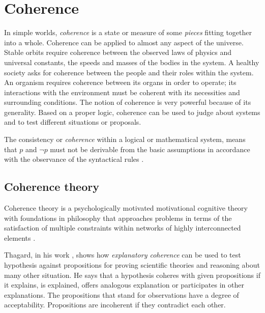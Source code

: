 \section{Coherence}
\label{sec:Coherence}

\def\coh{\mathrm{coh}}
\def\cohi{\mathrm{\widetilde{coh}}}

\medskip

In simple worlds, \emph{coherence} is a state or measure of some \emph{pieces}
fitting together into a whole. Coherence can be applied to almost any aspect of
the universe. Stable orbits require coherence between the observed laws of physics
and universal constants, the speeds and masses of the bodies in the system.
A healthy society asks for coherence between the people and their roles within
the system. An organism requires coherence between its organs in order to operate;
its interactions with the environment must be coherent with its necessities and
surrounding conditions. The notion of coherence is very powerful because of its
generality. Based on a proper logic, coherence can be used to judge about systems
and to test different situations or proposals.

\begin{displayquote}
The consistency or \emph{coherence} within a logical or mathematical
system, means that $p$ and $\neg p$ must not be derivable from the
basic assumptions in accordance with the observance of the syntactical
rules \cite{Daya60}.
\end{displayquote}


\subsection{Coherence theory}

\begin{displayquote}
Coherence theory is a psychologically motivated motivational cognitive theory with
foundations in philosophy that approaches problems in terms of the satisfaction
of multiple constraints within networks of highly interconnected elements
\cite[p.~19]{UAB-Thesis}.
\end{displayquote}

Thagard, in his work \cite{Thagard89}, shows how \emph{explanatory coherence}
can be used to test hypothesis against propositions for proving scientific theories
and reasoning about many other situation. He says that a hypothesis coheres
with given propositions if it explains, is explained, offers analogous explanation or
participates in other explanations. The propositions that stand for observations
have a degree of acceptability. Propositions are incoherent if they contradict
each other.

